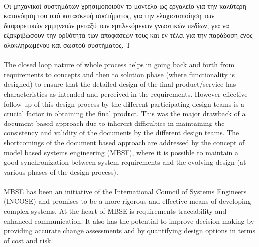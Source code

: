 \documentclass[a4paper,12pt,twoside]{report}
\begin{document}
{			\paragraph{} {Οι μηχανικοί συστημάτων χρησιμοποιούν το μοντέλο ως εργαλείο για την καλύτερη κατανόηση του υπό κατασκευή συστήματος, για την ελαχιστοποίηση των διαφορετικών ερμηνειών μεταξύ των εμπλεκόμενων γνωστικών πεδίων, για να εξακριβώσουν την ορθότητα των αποφάσεών τους και εν τέλει για την παράδοση ενός ολοκληρωμένου και σωστού συστήματος. Τ
			}
			
			\paragraph{} {\cite{IntegratedApproachMBMechatronicDesign:Qamar2011}}
			
			\paragraph{} {The closed loop nature of whole process helps in going back and forth from requirements to concepts and then to solution phase (where functionality is designed) to ensure that the detailed design of the final product/service has characteristics as intended and perceived in the requirements. However effective follow up of this design process by the different participating design teams is a crucial factor in obtaining the final product. This was the major drawback of a document based  approach due to inherent difficulties in maintaining the consistency and validity of the documents by the different design teams. The shortcomings of the document based approach are addressed by the concept of model based systems engineering (MBSE), where it is possible to maintain a good synchronization between system requirements and the evolving design (at various phases of the design process). \cite{ModelBasedBMechatronisSysMLMatlab}
			}
			
			\paragraph{} {MBSE has been an initiative of the International Council of Systems Engineers (INCOSE) and promises to be a more rigorous and effective means of developing complex systems. At the heart of MBSE is requirements traceability and enhanced communication. It also has the potential to improve decision making by providing accurate change assessments and by quantifying design options in terms of cost and risk. \cite{MBSESystemArchitectureNavalShipDesign}
			}
			
}
\end{document}
